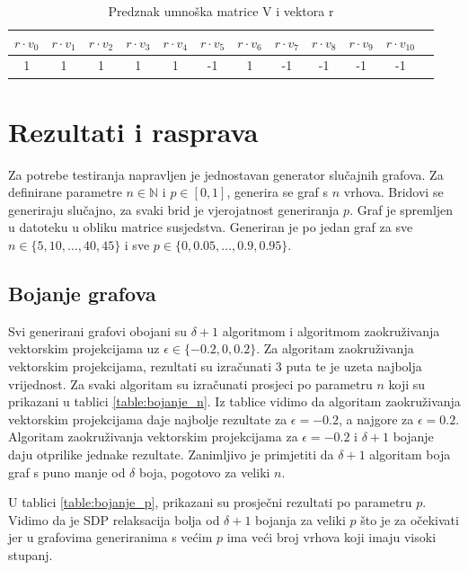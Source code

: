 \documentclass[diplomskirad]{fer}
\begin{document}
\begin{table}
  \caption{Predznak umnoška matrice V i vektora r}
  \label{table_clique_sign}
  \begin{tabular}{|c|c|c|c|c|c|c|c|c|c|c|c|}
    \hline
    $r \cdot v_0$ & $r \cdot v_1$ & $r \cdot v_2$ & $r \cdot v_3$ & $r \cdot v_4$ & $r \cdot v_5$ & $r \cdot v_6$ & $r \cdot v_7$ & $r \cdot v_8$ & $r \cdot v_9$ & $r \cdot v_{10}$ \\
    \hline
    \hline
    1 & 1 & 1 & 1 & 1 & -1 & 1 & -1 & -1 & -1 & -1 \\
    \hline
  \end{tabular}
\end{table}

\chapter{Rezultati i rasprava}
\label{pog:rezultati_i_rasprava}

Za potrebe testiranja napravljen je jednostavan generator slučajnih grafova. Za definirane parametre $n \in \mathbb{N}$ i $p \in [0,1]$, generira
se graf s $n$ vrhova. Bridovi se generiraju slučajno, za svaki brid je vjerojatnost generiranja $p$. Graf je spremljen u datoteku u obliku 
matrice susjedstva. Generiran je po jedan graf za sve $n \in \{5, 10, \dots, 40, 45\}$ i sve $p \in \{0, 0.05, \dots, 0.9, 0.95\}$.

\section{Bojanje grafova}
Svi generirani grafovi obojani su $\delta + 1$ algoritmom i algoritmom zaokruživanja vektorskim projekcijama uz $\epsilon \in \{-0.2, 0, 0.2\}$.
Za algoritam zaokruživanja vektorskim projekcijama, rezultati su izračunati 3 puta te je uzeta najbolja vrijednost. Za svaki algoritam su izračunati prosjeci po
parametru $n$ koji su prikazani u tablici \ref{table:bojanje_n}. Iz tablice vidimo da algoritam zaokruživanja vektorskim projekcijama daje najbolje rezultate za $\epsilon = -0.2$, a
najgore za $\epsilon = 0.2$. Algoritam zaokruživanja vektorskim projekcijama za $\epsilon = -0.2$ i $\delta + 1$ bojanje daju otprilike jednake rezultate. Zanimljivo je primjetiti
da $\delta + 1$ algoritam boja graf s puno manje od $\delta$ boja, pogotovo za veliki $n$.

U tablici \ref{table:bojanje_p}, prikazani su prosječni rezultati po parametru $p$. Vidimo da je SDP relaksacija bolja od $\delta + 1$ bojanja za veliki
$p$ što je za očekivati jer u grafovima generiranima s većim $p$ ima veći broj vrhova koji imaju visoki stupanj.
\end{document}
